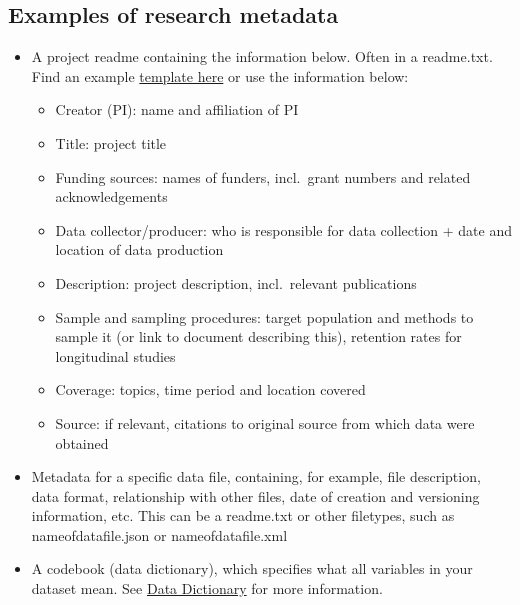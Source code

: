 \documentclass[
  letterpaper,
  DIV=11,
  numbers=noendperiod]{scrreprt}
\begin{document}
\hypertarget{examples-of-research-metadata}{%
\subsection*{\texorpdfstring{\textbf{Examples of research
metadata}}{Examples of research metadata}}\label{examples-of-research-metadata}}

\begin{itemize}
\item
  A project readme containing the information below. Often in a
  readme.txt. Find an example
  \href{https://cornell.app.box.com/v/ReadmeTemplate}{template here} or
  use the information below:

  \begin{itemize}
  \item
    Creator (PI): name and affiliation of PI
  \item
    Title: project title
  \item
    Funding sources: names of funders, incl.~grant numbers and related
    acknowledgements
  \item
    Data collector/producer: who is responsible for data collection +
    date and location of data production
  \item
    Description: project description, incl.~relevant publications
  \item
    Sample and sampling procedures: target population and methods to
    sample it (or link to document describing this), retention rates for
    longitudinal studies
  \item
    Coverage: topics, time period and location covered
  \item
    Source: if relevant, citations to original source from which data
    were obtained
  \end{itemize}
\item
  Metadata for a specific data file, containing, for example, file
  description, data format, relationship with other files, date of
  creation and versioning information, etc. This can be a readme.txt or
  other filetypes, such as nameofdatafile.json or nameofdatafile.xml
\item
  A codebook (data dictionary), which specifies what all variables in
  your dataset mean. See \protect\hyperlink{data-dictionary-1}{Data
  Dictionary} for more information.


\end{itemize}
\end{document}
